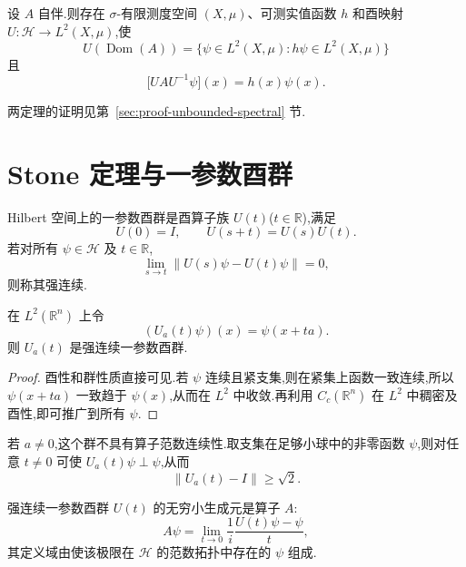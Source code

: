 \begin{theorem}\label{thm:unbounded-spectral-multiplication}
设 \(A\) 自伴.则存在 \(\sigma\)-有限测度空间 \((X,\mu)\)、可测实值函数 \(h\) 和酉映射 \(U:\mathcal{H}\to L^{2}(X,\mu)\),使
\[
U(\operatorname{Dom}(A))=\{\psi\in L^{2}(X,\mu):h\psi\in L^{2}(X,\mu)\}
\]
且
\[
\bigl[UAU^{-1}\psi\bigr](x)=h(x)\psi(x).
\]
\end{theorem}

两定理的证明见第~\ref{sec:proof-unbounded-spectral} 节.

\section{Stone 定理与一参数酉群}
\label{sec:one-parameter-unitary-groups}

\begin{definition}[一参数酉群]\label{def:one-parameter-unitary-group}
Hilbert 空间上的一参数酉群是酉算子族 \(U(t)\)(\(t\in\mathbb{R}\)),满足
\[
U(0)=I,\qquad U(s+t)=U(s)U(t).
\]
若对所有 \(\psi\in\mathcal{H}\) 及 \(t\in\mathbb{R}\),
\[
\lim_{s\to t}\|U(s)\psi-U(t)\psi\|=0,
\label{eq:strong-continuity-unitary-group}
\]
则称其强连续.
\end{definition}

\begin{example}[平移一参数酉群]\label{ex:translation-unitary-group}
在 \(L^{2}(\mathbb{R}^{n})\) 上令
\[
(U_{a}(t)\psi)(x)=\psi(x+ta).
\label{eq:translation-group}
\]
则 \(U_{a}(t)\) 是强连续一参数酉群.
\end{example}

\begin{proof}
酉性和群性质直接可见.若 \(\psi\) 连续且紧支集,则在紧集上函数一致连续,所以 \(\psi(x+ta)\) 一致趋于 \(\psi(x)\),从而在 \(L^{2}\) 中收敛.再利用 \(C_{c}(\mathbb{R}^{n})\) 在 \(L^{2}\) 中稠密及酉性,即可推广到所有 \(\psi\).
\end{proof}

若 \(a\neq0\),这个群不具有算子范数连续性.取支集在足够小球中的非零函数 \(\psi\),则对任意 \(t\neq0\) 可使 \(U_{a}(t)\psi\perp\psi\),从而
\[
\|U_{a}(t)-I\|\geq\sqrt{2}.
\]

\begin{definition}[无穷小生成元]\label{def:unitary-generator}
强连续一参数酉群 \(U(t)\) 的无穷小生成元是算子 \(A\):
\[
A\psi=\lim_{t\to0}\frac{1}{i}\frac{U(t)\psi-\psi}{t},
\label{eq:unitary-generator}
\]
其定义域由使该极限在 \(\mathcal{H}\) 的范数拓扑中存在的 \(\psi\) 组成.
\end{definition}

